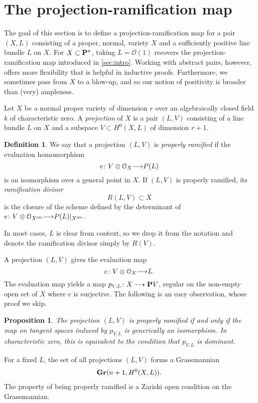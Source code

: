 \documentclass[11pt,reqno]{amsart}
\theoremstyle{plain}
\newtheorem{proposition}[theorem]{Proposition}
\theoremstyle{definition}
\newtheorem{definition}[theorem]{Definition}
\theoremstyle{remark}
\numberwithin{equation}{section}
\renewcommand{\to}{{\longrightarrow}}
\numberwithin{equation}{section}
\renewcommand{\O}{\mathcal O}
\begin{document}
\section{The projection-ramification map}\label{sec:prmap}
The goal of this section is to define a projection-ramification map for a pair $(X, L)$ consisting of a proper, normal, variety $X$ and a sufficiently positive line bundle $L$ on $X$.
For $X \subset \P^n$, taking $L = \O(1)$ recovers the projection-ramification map introduced in \autoref{sec:intro}.
Working with abstract pairs, however, offers more flexibility that is helpful in inductive proofs.
Furthermore, we sometimes pass from $X$ to a blow-up, and so our notion of positivity is broader than (very) ampleness.

Let $X$ be a normal proper variety of dimension $r$ over an algebraically closed field $k$ of characteristic zero.
A \emph{projection} of $X$ is a pair $(L,V)$ consisting of a line bundle $L$ on $X$ and a subspace $V \subset H^{0}(X,L)$ of dimension $r+1$.
\begin{definition}  \label{definition:properlyramified}
We say that a projection $(L,V)$ is \emph{properly ramified} if the evaluation homomorphism
\[e \from V \otimes \O_{X} \to P(L)\]
is an isomorphism over a general point in $X$.  If $(L,V)$ is properly ramified, its \emph{ramification divisor}
\[R(L,V) \subset X\]
is the closure of the scheme defined by the determinant of $e \from V \otimes \O_{X^{\rm sm}} \to P(L)|_{X^{\rm sm}}$.
\end{definition}
In most cases, $L$ is clear from context, so we drop it from the notation and denote the ramification divisor simply by $R(V)$.

A projection $(L, V)$ gives the evaluation map
\[e \from V \otimes \O_X \to L.\]
The evaluation map yields a map $p_{V,L} \from X \dashrightarrow \P V$, regular on the non-empty open set of $X$ where $e$ is surjective.
The following is an easy observation, whose proof we skip.
\begin{proposition}\label{prop:proj}
  The projection $(L, V)$ is properly ramified if and only if the map on tangent spaces induced by $p_{V,L}$ is generically an isomorphism.
  In characteristic zero, this is equivalent to the condition that $p_{V,L}$ is dominant.
\end{proposition}

For a fixed $L$, the set of all projections $(L, V)$ forms a Grassmannian 
\begin{align*}
  \Gr(n+1, H^{0}(X,L)).
\end{align*}
The property of being properly ramified is a Zariski open condition on the Grassmannian.
\end{document}
